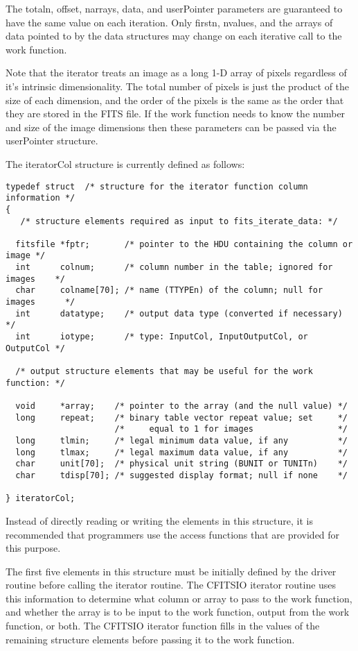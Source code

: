 \documentclass[11pt]{book}
\begin{document}
The totaln, offset, narrays, data, and userPointer parameters are
guaranteed to have the same value on each iteration.  Only firstn,
nvalues, and the arrays of data pointed to by the data structures may
change on each iterative call to the work function.

Note that the iterator treats an image as a long 1-D array of pixels
regardless of it's intrinsic dimensionality.  The total number of
pixels is just the product of the size of each dimension, and the order
of the pixels is the same as the order that they are stored in the FITS
file. If the work function needs to know the number and size of the
image dimensions then these parameters can be passed via the
userPointer structure.

The iteratorCol structure is currently defined as follows:

\begin{verbatim}
typedef struct  /* structure for the iterator function column information */
{
   /* structure elements required as input to fits_iterate_data: */

  fitsfile *fptr;       /* pointer to the HDU containing the column or image */
  int      colnum;      /* column number in the table; ignored for images    */
  char     colname[70]; /* name (TTYPEn) of the column; null for images      */
  int      datatype;    /* output data type (converted if necessary) */
  int      iotype;      /* type: InputCol, InputOutputCol, or OutputCol */

  /* output structure elements that may be useful for the work function: */

  void     *array;    /* pointer to the array (and the null value) */
  long     repeat;    /* binary table vector repeat value; set     */
                      /*     equal to 1 for images                 */
  long     tlmin;     /* legal minimum data value, if any          */
  long     tlmax;     /* legal maximum data value, if any          */
  char     unit[70];  /* physical unit string (BUNIT or TUNITn)    */
  char     tdisp[70]; /* suggested display format; null if none    */

} iteratorCol;
\end{verbatim}

Instead of directly reading or writing the elements in this structure,
it is recommended that programmers use the access functions that are
provided for this purpose.

The first five elements in this structure must be initially defined by
the driver routine before calling the iterator routine.  The CFITSIO
iterator routine uses this information to determine what column or
array to pass to the work function, and whether the array is to be
input to the work function, output from the work function, or both.
The CFITSIO iterator function fills in the values of the remaining
structure elements before passing it to the work function.
\end{document}
